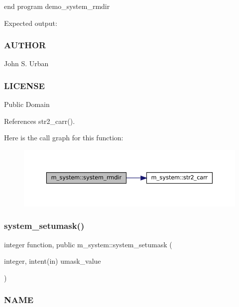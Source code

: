 end program demo\+\_\+system\+\_\+rmdir

Expected output\+:

\subsubsection*{A\+U\+T\+H\+OR}

John S. Urban \subsubsection*{L\+I\+C\+E\+N\+SE}

Public Domain 

References str2\+\_\+carr().

Here is the call graph for this function\+:\nopagebreak
\begin{figure}[H]
\begin{center}
\leavevmode
\includegraphics[width=350pt]{namespacem__system_a21fd3e1ccd50cef6adc539ef3d7a9836_cgraph}
\end{center}
\end{figure}
\mbox{\label{namespacem__system_a04fd02e6f5ce2f8ecdfb577e1490feba}} 
\subsubsection{\texorpdfstring{system\+\_\+setumask()}{system\_setumask()}}
{\footnotesize\ttfamily integer function, public m\+\_\+system\+::system\+\_\+setumask (\begin{DoxyParamCaption}\item[{integer, intent(in)}]{umask\+\_\+value }\end{DoxyParamCaption})}



\subsubsection*{N\+A\+ME}

